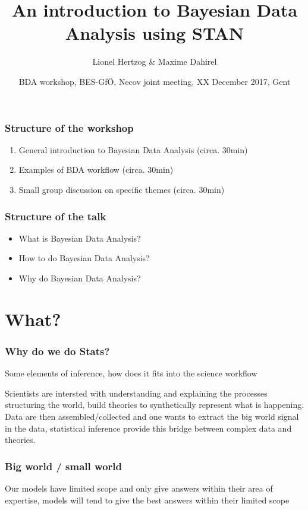 \documentclass{beamer}
\title{An introduction to Bayesian Data Analysis using STAN}
\subtitle{}
\author{Lionel Hertzog \& Maxime Dahirel}
\date{BDA workshop, BES-Gf\"{O}, Necov joint meeting, XX December 2017, Gent}
\begin{document}
 
 \frame{\titlepage}
 

\begin{frame}
 \frametitle{\bf Structure of the workshop}
  \begin{enumerate}
   \item General introduction to Bayesian Data Analysis (circa. 30min)
   \item Examples of BDA workflow (circa. 30min)
   \item Small group discussion on specific themes (circa. 30min)
  \end{enumerate}

 
 \end{frame}
 
\begin{frame}
 \frametitle{\bf Structure of the talk}
  \begin{itemize}
   \item What is Bayesian Data Analysis?
   \item How to do Bayesian Data Analysis?
   \item Why do Bayesian Data Analysis?
  \end{itemize}

 
 \end{frame} 
 
 
\section*{What?} 
 
 \begin{frame}
  \frametitle{\bf Why do we do Stats?}
  
  Some elements of inference, how does it fits into the science workflow
  
  Scientists are intersted with understanding and explaining the processes structuring the world, build theories to synthetically represent what is happening.
  Data are then assembled/collected and one wants to extract the big world signal in the data, statistical inference provide this bridge between complex data and
  theories. 
  
  
  
 \end{frame}

  \begin{frame}
  \frametitle{\bf Big world / small world}
  
  Our models have limited scope and only give answers within their area of expertise, models will tend to give the best answers within their limited scope  
  
 \end{frame}
 
\end{document}
